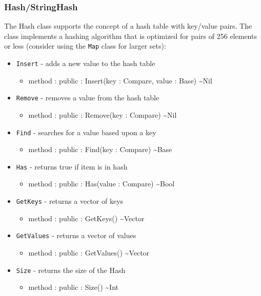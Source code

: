 \documentclass[11pt]{article}
\begin{document}
\subsubsection{Hash/StringHash}
The Hash class supports the concept of a hash table with key/value
pairs.  The class implements a hashing algorithm that is optimized for
pairs of 256 elements or less (consider using the \texttt{Map} class
for larger sets):
\begin{itemize}
\item \texttt{Insert} - adds a new value to the hash table
  \begin{itemize}
  \item method : public : Insert(key : Compare, value : Base) \textasciitilde Nil
  \end{itemize}
\item \texttt{Remove} - removes a value from the hash table
  \begin{itemize}
  \item method : public : Remove(key : Compare) \textasciitilde Nil
  \end{itemize}
\item \texttt{Find} - searches for a value based upon a key
  \begin{itemize}
  \item method : public : Find(key : Compare) \textasciitilde Base
  \end{itemize}
\item \texttt{Has} - returns true if item is in hash
  \begin{itemize}
  \item method : public : Has(value : Compare) \textasciitilde Bool
  \end{itemize}
\item \texttt{GetKeys} - returns a vector of keys
  \begin{itemize}
  \item method : public : GetKeys() \textasciitilde Vector
  \end{itemize}
\item \texttt{GetValues} - returns a vector of values
  \begin{itemize}
  \item method : public : GetValues() \textasciitilde Vector
  \end{itemize}

\item \texttt{Size} - returns the size of the Hash
  \begin{itemize}
  \item method : public : Size() \textasciitilde Int
  \end{itemize}
\end{itemize}
\end{document}
